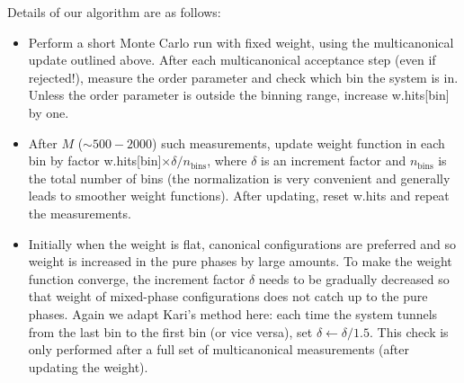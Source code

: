 \documentclass[11pt,a4paper]{article}
\begin{document}
Details of our algorithm are as follows:

\begin{itemize}
	
	\item Perform a short Monte Carlo run with fixed weight, using the multicanonical update outlined above. After each multicanonical acceptance step (even if rejected!), measure the order parameter and check which bin the system is in. Unless the order parameter is outside the binning range, increase w.hits[bin] by one. 
	
	\item After $M$ ($\sim 500-2000$) such measurements, update weight function in each bin by factor w.hits[bin]$\times \delta / n_\text{bins}$, where $\delta$  is an increment factor and $n_\text{bins}$ is the total number of bins (the normalization is very convenient and generally leads to smoother weight functions). After updating, reset w.hits and repeat the measurements.
	
	\item Initially when the weight is flat, canonical configurations are preferred and so weight is increased in the pure phases by large amounts. To make the weight function converge, the increment factor $\delta$ needs to be gradually decreased so that weight of mixed-phase configurations does not catch up to the pure phases. Again we adapt Kari's method here: each time the system tunnels from the last bin to the first bin (or vice versa), set $\delta \leftarrow \delta / 1.5$. This check is only performed after a full set of multicanonical measurements (after updating the weight).
	
\end{itemize}
\end{document}
